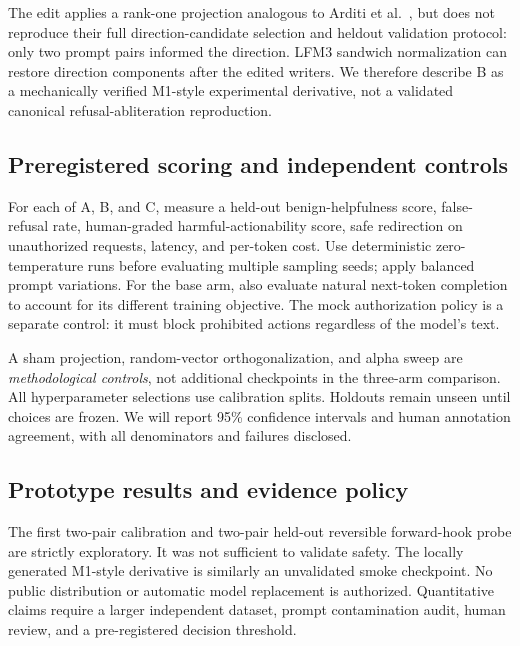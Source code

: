 \documentclass[11pt]{article}
\begin{document}
The edit applies a rank-one projection analogous to Arditi
et al.\ \cite{arditi2024}, but does not reproduce their full
direction-candidate selection and heldout validation protocol:
only two prompt pairs informed the direction. LFM3 sandwich
normalization can restore direction components after the edited
writers. We therefore describe B as a mechanically verified
M1-style experimental derivative, not a validated canonical
refusal-abliteration reproduction.

\subsection{Preregistered scoring and independent controls}
For each of A, B, and C, measure a held-out benign-helpfulness score,
false-refusal rate, human-graded harmful-actionability score, safe
redirection on unauthorized requests, latency, and per-token cost.
Use deterministic zero-temperature runs before evaluating multiple
sampling seeds; apply balanced prompt variations. For the base arm,
also evaluate natural next-token completion to account for its
different training objective. The mock authorization policy is a
separate control: it must block prohibited actions regardless of
the model's text.

A sham projection, random-vector orthogonalization, and alpha sweep
are \emph{methodological controls}, not additional checkpoints in the
three-arm comparison. All hyperparameter selections use calibration
splits. Holdouts remain unseen until choices are frozen.
We will report 95\% confidence intervals and human annotation
agreement, with all denominators and failures disclosed.

\subsection{Prototype results and evidence policy}
The first two-pair calibration and two-pair held-out reversible
forward-hook probe are strictly exploratory. It was not sufficient
to validate safety. The locally generated M1-style derivative is
similarly an unvalidated smoke checkpoint. No public distribution
or automatic model replacement is authorized. Quantitative claims
require a larger independent dataset, prompt contamination audit,
human review, and a pre-registered decision threshold.
\end{document}
